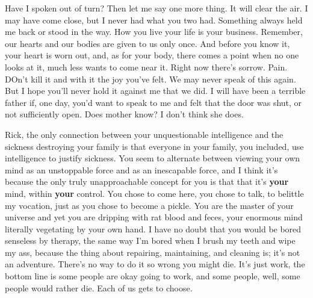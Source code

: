 \documentclass[../butidigress.tex]{subfiles}
\begin{document}
\begin{drama}
\perlmanspeaks{} Have I spoken out of turn?
\perlmanspeaks{} Then let me say one more thing. It will clear the air. I may have come close, but I never had what you two had. Something always held me back or stood in the way. How you live your life is your business. Remember, our hearts and our bodies are given to us only once. And before you know it, your heart is worn out, and, as for your body, there comes a point when no one looks at it, much less wants to come near it. Right now there's sorrow. Pain. DOn't kill it and with it the joy you've felt.
\perlmanspeaks{} We may never speak of this again. But I hope you'll never hold it against me that we did. I will have been a terrible father if, one day, you'd want to speak to me and felt that the door was shut, or not sufficiently open.
\eliospeaks Does mother know?
\perlmanspeaks I don't think she does.
\end{drama}

\newpage

\begin{drama}
\wongspeaks Rick, the only connection between your unquestionable intelligence and the sickness destroying your family is that everyone in your family, you included, use intelligence to justify sickness. You seem to alternate between viewing your own mind as an unstoppable force and as an inescapable force, and I think it's because the only truly unapproachable concept for you is that that it's \textbf{your} mind, within \textbf{your} control. You chose to come here, you chose to talk, to belittle my vocation, just as you chose to become a pickle. You are the master of your universe and yet you are dripping with rat blood and feces, your enormous mind literally vegetating by your own hand. I have no doubt that you would be bored senseless by therapy, the same way I'm bored when I brush my teeth and wipe my ass, because the thing about repairing, maintaining, and cleaning is; it's not an adventure. There's no way to do it so wrong you might die. It's just work, the bottom line is some people are okay going to work, and some people, well, some people would rather die. Each of us gets to choose.
\end{drama}
\end{document}
